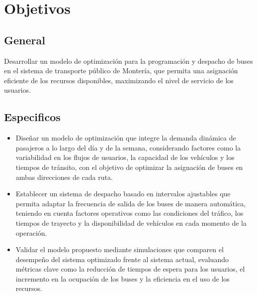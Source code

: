 \documentclass[preprint,11pt]{elsarticle}
\begin{document}
\section{Objetivos}

\subsection*{General}

Desarrollar un modelo de optimización para la programación y despacho de buses en el sistema de transporte público de Montería, que permita una asignación eficiente de los recursos disponibles, maximizando el nivel de servicio de los usuarios.

\subsection*{Especificos}

\begin{itemize}
    \item Diseñar un modelo de optimización que integre la demanda dinámica de pasajeros a lo largo del día y de la semana, considerando factores como la variabilidad en los flujos de usuarios, la capacidad de los vehículos y los tiempos de tránsito, con el objetivo de optimizar la asignación de buses en ambas direcciones de cada ruta.
    \item Establecer un sistema de despacho basado en intervalos ajustables que permita adaptar la frecuencia de salida de los buses de manera automática, teniendo en cuenta factores operativos como las condiciones del tráfico, los tiempos de trayecto y la disponibilidad de vehículos en cada momento de la operación.
    \item Validar el modelo propuesto mediante simulaciones que comparen el desempeño del sistema optimizado frente al sistema actual, evaluando métricas clave como la reducción de tiempos de espera para los usuarios, el incremento en la ocupación de los buses y la eficiencia en el uso de los recursos.
\end{itemize}
\end{document}
